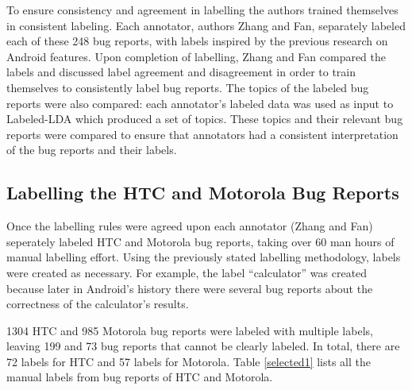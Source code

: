 \documentclass[10pt, conference, compsocconf]{IEEEtran}
\begin{document}
To ensure consistency and agreement in labelling the authors trained
themselves in consistent labeling.
Each annotator, authors Zhang and Fan, separately labeled each of these 248 bug reports, 
with labels inspired by the previous research on Android
features. 
Upon completion of labelling, 
 Zhang and Fan compared the labels
and discussed label agreement and
disagreement in order to train themselves to consistently label bug
reports.
The topics of the labeled bug reports were also compared: each annotator's labeled data was used as input to
 Labeled-LDA which produced a set of topics.
These topics and their relevant bug reports were compared to ensure
that annotators had a 
consistent interpretation of the bug reports and their labels.




\subsection{Labelling the HTC and Motorola Bug Reports}

Once the labelling rules were agreed upon each annotator (Zhang and Fan)
seperately labeled HTC and Motorola bug reports, taking over 60 man
hours of manual labelling effort.
Using the previously stated labelling methodology, labels were created as necessary.
For example, the label ``calculator'' was created because later in
Android's history there were 
several bug reports about the correctness of the
calculator's results. 


1304 HTC and 985 Motorola bug reports were labeled with multiple
labels, leaving 199 and 73 bug reports that cannot be clearly labeled.
In total, there are 72 labels for HTC and 57 labels for Motorola.
Table \ref{selected1} lists all the manual labels from bug reports of HTC
and Motorola.
\end{document}
